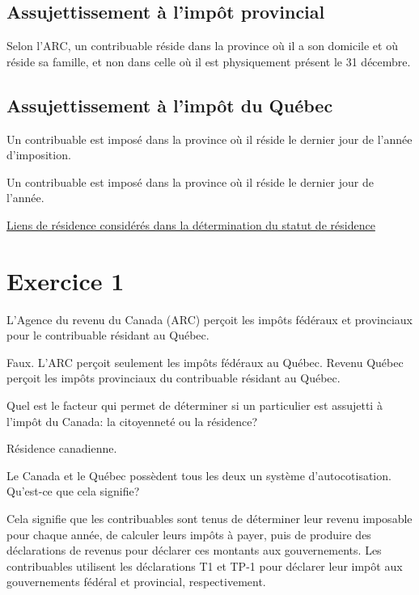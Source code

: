 \subsection{Assujettissement à l'impôt provincial}
\begin{note}
	Selon l'ARC, un contribuable réside dans la province où il a son domicile et où réside sa famille, et non dans celle où il est physiquement présent le 31 décembre.
\end{note}


\subsection{Assujettissement à l'impôt du Québec}
\begin{note}
	Un contribuable est imposé dans la province où il réside le dernier jour de l'année d'imposition.
\end{note}
Un contribuable est imposé dans la province où il réside le dernier jour de l'année.

\qct\href{https://www.revenuquebec.ca/fr/citoyens/votre-situation/statut-de-residence-et-assujettissement-a-limpot/liens-de-residence-consideres-dans-la-determination-du-statut-de-residence/}{Liens de résidence considérés dans la détermination du statut de résidence}



\section{Exercice 1}
\setcounter{question}{0}
\begin{question}
	L'Agence du revenu du Canada (ARC) perçoit les impôts fédéraux et provinciaux pour le contribuable résidant au Québec.
\end{question}
Faux. L'ARC perçoit seulement les impôts fédéraux au Québec. Revenu Québec perçoit les impôts provinciaux du contribuable résidant au Québec.

\begin{question}
	Quel est le facteur qui permet de déterminer si un particulier est assujetti à l'impôt du Canada: la citoyenneté ou la résidence?
\end{question}
Résidence canadienne.

\begin{question}
	Le Canada et le Québec possèdent tous les deux un système d'autocotisation. Qu'est-ce que cela signifie?
\end{question}
Cela signifie que les contribuables sont tenus de déterminer leur revenu imposable pour chaque année, de calculer leurs impôts à payer, puis de produire des déclarations de revenus pour déclarer ces montants aux gouvernements. Les contribuables utilisent les déclarations T1 et TP-1 pour déclarer leur impôt aux gouvernements fédéral et provincial, respectivement.

